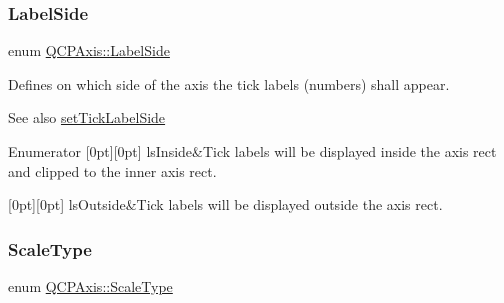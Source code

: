 \subsubsection{\texorpdfstring{Label\+Side}{LabelSide}}
{\footnotesize\ttfamily enum \hyperlink{class_q_c_p_axis_a24b13374b9b8f75f47eed2ea78c37db9}{Q\+C\+P\+Axis\+::\+Label\+Side}}

Defines on which side of the axis the tick labels (numbers) shall appear.

\begin{DoxySeeAlso}{See also}
\hyperlink{class_q_c_p_axis_a13ec644fc6e22715744c92c6dfa4f0fa}{set\+Tick\+Label\+Side} 
\end{DoxySeeAlso}
\begin{DoxyEnumFields}{Enumerator}
[0pt][0pt]{}\mbox{\label{class_q_c_p_axis_a24b13374b9b8f75f47eed2ea78c37db9aae7b027ac2839cf4ad611df30236fc3f}} 
ls\+Inside&Tick labels will be displayed inside the axis rect and clipped to the inner axis rect. \\
\hline

[0pt][0pt]{}\mbox{\label{class_q_c_p_axis_a24b13374b9b8f75f47eed2ea78c37db9a2eadb509fc0c9a8b35b85c86ec9f3c7a}} 
ls\+Outside&Tick labels will be displayed outside the axis rect. \\
\hline

\end{DoxyEnumFields}
\mbox{\label{class_q_c_p_axis_a36d8e8658dbaa179bf2aeb973db2d6f0}} 
\subsubsection{\texorpdfstring{Scale\+Type}{ScaleType}}
{\footnotesize\ttfamily enum \hyperlink{class_q_c_p_axis_a36d8e8658dbaa179bf2aeb973db2d6f0}{Q\+C\+P\+Axis\+::\+Scale\+Type}}

